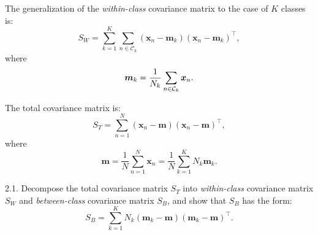 \documentclass{article}
\begin{document}
The generalization of the \emph{within-class} covariance matrix to the case of $K$ classes is:
\begin{equation}
  S_{W}=\sum_{k=1}^{K}\sum_{n\in \mathcal{C}_{k}}(\bm{x}_{n}-\bm{m}_{k})(\bm{x}_{n}-\bm{m}_{k})^{\top},
\end{equation}
where
\begin{equation}
  \bm{m}_k=\frac{1}{N_{k}}\sum_{n\in \mathcal{C}_{k}}\bm{x}_{n}.
\end{equation}

The total covariance matrix is:
\begin{equation}
  S_{T}=\sum_{n=1}^{N}(\bm{x}_{n}-\bm{m})(\bm{x}_{n}-\bm{m})^{\top},
\end{equation}
where
\begin{equation}
  \bm{m}=\frac{1}{N}\sum_{n=1}^{N}\bm{x}_{n}=\frac{1}{N}\sum_{k=1}^{K}N_{k}\bm{m}_{k}.
\end{equation}


2.1. Decompose the total covariance matrix $S_{T}$ into \emph{within-class} covariance matrix $S_{W}$ and \emph{between-class} covariance matrix $S_{B}$, and show that $S_{B}$ has the form:
\begin{equation}
  S_{B}=\sum_{k=1}^{K}N_{k}(\bm{m}_{k}-\bm{m})(\bm{m}_{k}-\bm{m})^{\top}.
\end{equation}
\end{document}
